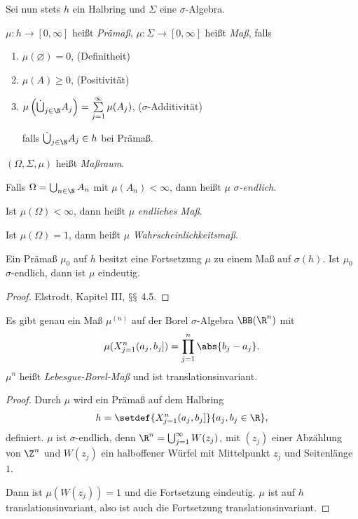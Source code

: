 Sei nun stets $h$ ein Halbring und $\Sigma$ eine $\sigma$-Algebra.

\begin{defn}
\label{defn:3.8}
$\mu: h\to[0,\infty]$ heißt \emph{Prämaß}, $\mu: \Sigma\to[0,\infty]$ heißt
\emph{Maß}, falls
\begin{enumerate}[label=(\roman{*})]
  \item $\mu(\varnothing) = 0$, (Definitheit)
  \item $\mu(A)\ge 0$, (Positivität)
  \item $\mu\left(\dot{\bigcup}_{j\in\N} A_j \right) = \sum\limits_{j=1}^\infty
  \mu(A_j)$, ($\sigma$-Additivität)
  
  falls $\dot{\bigcup}_{j\in\N} A_j\in h$ bei Prämaß. 
\end{enumerate}
$(\Omega,\Sigma,\mu)$ heißt \emph{Maßraum}.

Falls $\Omega=\bigcup_{n\in\N} A_n$ mit $\mu(A_n)<\infty$, dann heißt $\mu$
\emph{$\sigma$-endlich}.

Ist $\mu(\Omega) <\infty$, dann heißt $\mu$ \emph{endliches Maß}.

Ist $\mu(\Omega) = 1$, dann heißt $\mu$ \emph{Wahrscheinlichkeitsmaß}.\fishhere
\end{defn}

\begin{prop}[Forsetzungssatz]
\label{prop:3.9}
Ein Prämaß $\mu_0$ auf $h$ besitzt eine Fortsetzung $\mu$ zu einem Maß auf
$\sigma(h)$. Ist $\mu_0$ $\sigma$-endlich, dann ist $\mu$ eindeutig.\fishhere
\end{prop}
\begin{proof}
Elstrodt, Kapitel III, $\mathsection\mathsection$ 4.5.\qedhere
\end{proof}

\begin{cor}
\label{prop:3.10}
Es gibt genau ein Maß $\mu^{(n)}$ auf der Borel $\sigma$-Algebra $\BB(\R^n)$ mit
\begin{align*}
\mu(X_{j=1}^n (a_j,b_j]) = \prod_{j=1}^n \abs{b_j-a_j}.
\end{align*}
$\mu^{n}$ heißt \emph{Lebesgue-Borel-Maß} und ist
translationsinvariant.\fishhere
\end{cor}
\begin{proof}
Durch $\mu$ wird ein Prämaß auf dem Halbring
\begin{align*}
h = \setdef{X_{j=1}^n (a_j,b_j]}{a_j,b_j\in\R},
\end{align*}
definiert. $\mu$ ist $\sigma$-endlich, denn $\R^n = \bigcup_{j=1}^\infty
W(z_j)$, mit $(z_j)$ einer Abzählung von $\Z^n$ und $W(z_j)$ ein halboffener
Würfel mit Mittelpunkt $z_j$ und Seitenlänge $1$.

Dann ist $\mu(W(z_j)) = 1$ und die Fortsetzung eindeutig. $\mu$ ist auf $h$
translationsinvariant, also ist auch die Fortsetzung
translationsinvariant.\qedhere
\end{proof}

